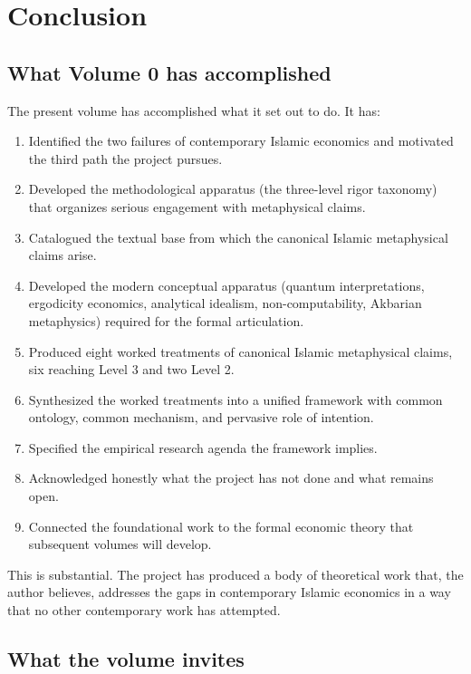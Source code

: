 \section{Conclusion}
\label{sec:to-vol1-conclusion}

\subsection{What Volume 0 has accomplished}

The present volume has accomplished what it set out to do. It
has:

\begin{enumerate}[leftmargin=2em]
    \item Identified the two failures of contemporary Islamic
    economics and motivated the third path the project pursues.
    \item Developed the methodological apparatus (the three-level
    rigor taxonomy) that organizes serious engagement with
    metaphysical claims.
    \item Catalogued the textual base from which the canonical
    Islamic metaphysical claims arise.
    \item Developed the modern conceptual apparatus (quantum
    interpretations, ergodicity economics, analytical idealism,
    non-computability, Akbarian metaphysics) required for the
    formal articulation.
    \item Produced eight worked treatments of canonical Islamic
    metaphysical claims, six reaching Level 3 and two Level 2.
    \item Synthesized the worked treatments into a unified
    framework with common ontology, common mechanism, and
    pervasive role of intention.
    \item Specified the empirical research agenda the framework
    implies.
    \item Acknowledged honestly what the project has not done and
    what remains open.
    \item Connected the foundational work to the formal economic
    theory that subsequent volumes will develop.
\end{enumerate}

This is substantial. The project has produced a body of
theoretical work that, the author believes, addresses the gaps
in contemporary Islamic economics in a way that no other
contemporary work has attempted.

\subsection{What the volume invites}

